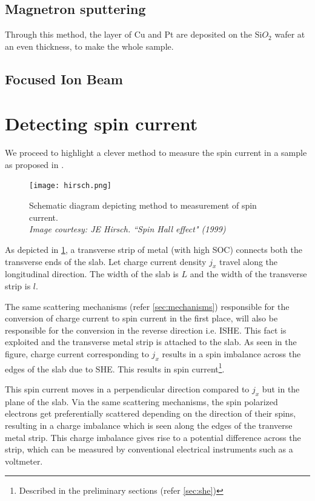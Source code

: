 \subsection{Magnetron sputtering}

Through this method, the layer of Cu and Pt are deposited on the Si$O_2$ wafer at an even thickness, to make the whole sample.

\subsection{Focused Ion Beam}




\section{Detecting spin current}

We proceed to highlight a clever method to measure the spin current in a sample as proposed in \cite{hirsch1999spin}.

\begin{figure}[h!]
    \texttt{[image: hirsch.png]}
    \caption{Schematic diagram depicting method to measurement of spin current.\\ \vspace{0.2cm} \textit{Image courtesy: JE Hirsch. ``Spin Hall effect" (1999)}}
    \label{fig:hirsch-measure}
\end{figure}

As depicted in \cref{fig:hirsch-measure}, a transverse strip of metal (with high SOC) connects both the transverse ends of the slab.
Let charge current density \( j_x \) travel along the longitudinal direction.
The width of the slab is \( L \) and the width of the transverse strip is \( l \).

The same scattering mechanisms (refer \cref{sec:mechanisms}) responsible for the conversion of charge current to spin current in the first place, will also be responsible for the conversion in the reverse direction i.e. ISHE.
This fact is exploited and the transverse metal strip is attached to the slab.
As seen in the figure, charge current corresponding to \( j_x \) results in a spin imbalance across the edges of the slab due to SHE.
This results in spin current\footnote{Described in the preliminary sections (refer \cref{sec:she})}.

This spin current moves in a perpendicular direction compared to \( j_x \) but in the plane of the slab.
Via the same scattering mechanisms, the spin polarized electrons get preferentially scattered depending on the direction of their spins, resulting in a charge imbalance which is seen along the edges of the tranverse metal strip.
This charge imbalance gives rise to a potential difference across the strip, which can be measured by conventional electrical instruments such as a voltmeter.


